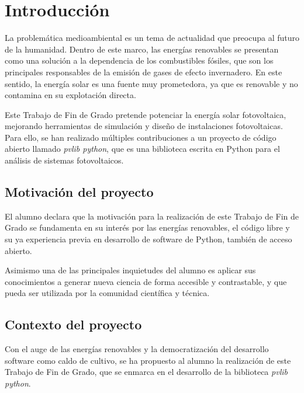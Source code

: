 \chapter{Introducción} \label{chp:intro}

La problemática medioambiental es un tema de actualidad que preocupa al futuro de la humanidad. Dentro de este marco, las energías renovables se presentan como una solución a la dependencia de los combustibles fósiles, que son los principales responsables de la emisión de gases de efecto invernadero. En este sentido, la energía solar es una fuente muy prometedora, ya que es renovable y no contamina en su explotación directa.

Este Trabajo de Fin de Grado pretende potenciar la energía solar fotovoltaica, mejorando herramientas de simulación y diseño de instalaciones fotovoltaicas. Para ello, se han realizado múltiples contribuciones a un proyecto de código abierto llamado \textit{pvlib python}, que es una biblioteca escrita en Python para el análisis de sistemas fotovoltaicos.


\section{Motivación del proyecto} \label{sct:intro:motivacion}

El alumno declara que la motivación para la realización de este Trabajo de Fin de Grado se fundamenta en su interés por las energías renovables, el código libre y su ya experiencia previa en desarrollo de software de Python, también de acceso abierto.

Asimismo una de las principales inquietudes del alumno es aplicar sus conocimientos a generar nueva ciencia de forma accesible y contrastable, y que pueda ser utilizada por la comunidad científica y técnica.


\section{Contexto del proyecto} \label{sct:intro:contexto}

Con el auge de las energías renovables y la democratización del desarrollo software como caldo de cultivo, se ha propuesto al alumno la realización de este Trabajo de Fin de Grado, que se enmarca en el desarrollo de la biblioteca \textit{pvlib python}.

